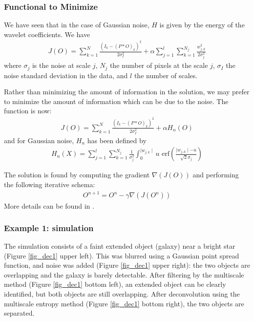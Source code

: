 \documentclass[11pt,a4paper]{article}
\begin{document}
\subsubsection{Functional to Minimize}

We have seen that in the case of Gaussian noise, $H$ is given by the 
energy of the wavelet coefficients. We have
\begin{eqnarray}
J(O)= \sum_{k=1}^N
 \frac{(I_k-(P*O)_k)^2}{2\sigma_I^2} + \alpha \sum_{j=1}^{l} \sum_{k=1}^{N_j} \frac{w_{j,k}^2}{2 \sigma_j^2}
\end{eqnarray}
where $\sigma_j$ is the noise at scale $j$, $N_j$ the number of pixels at the
scale $j$, $\sigma_I$ the noise standard deviation in the data, and $l$ 
the number of scales.

Rather than minimizing the amount of information in the solution, we may
prefer to minimize the amount of information which can be due to the noise.
The function is now:
\begin{eqnarray}
J(O)= \sum_{k=1}^N
 \frac{(I_k-(P*O)_k)^2}{2\sigma_I^2} + \alpha H_n(O)
\end{eqnarray}
and for Gaussian noise, $H_n$ has been defined by 
\begin{eqnarray}
H_n(X) = \sum_{j=1}^{l} \sum_{k=1}^{N_j} \frac{1}{\sigma_j^2} \int_{0}^{\mid w_{j,k} \mid} u 
         \mbox{ erf}\left(\frac{\mid w_{j,k} \mid -u}{\sqrt{2} \sigma_j}\right)
\end{eqnarray}

The solution is found by computing the gradient $\nabla(J(O))$ 
and performing the following iterative schema:
\begin{eqnarray}
O^{n+1} = O^{n} - \gamma \nabla(J(O^n))
\label{eq_iter1}
\end{eqnarray}
More details can be found in \cite{starck:sta01_1}.

\subsubsection{Example 1: simulation}

The simulation consists of a faint extended object (galaxy) 
near a bright star (Figure \ref{fig_dec1} upper left). 
This was blurred using a Gaussian point spread function, and 
noise was added (Figure \ref{fig_dec1} upper right): the two objects are overlapping and the galaxy
is barely detectable. After filtering by the multiscale method 
(Figure \ref{fig_dec1} bottom left),
 an extended object can be clearly identified, but both objects are still
overlapping. After deconvolution using the multiscale  entropy method (Figure 
\ref{fig_dec1} bottom right), 
the two objects are separated. \\
\end{document}
